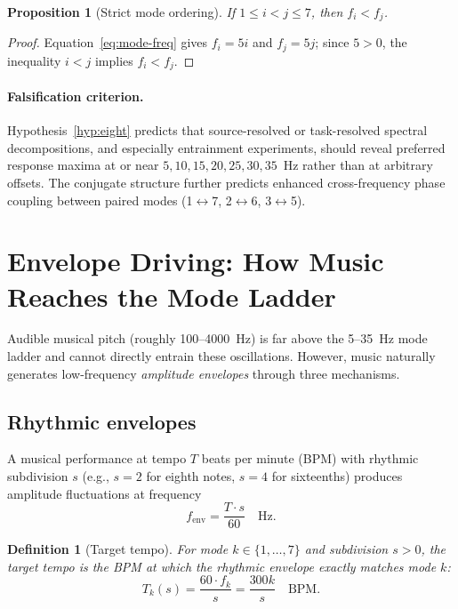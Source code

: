 \documentclass[11pt,a4paper]{article}
\newtheorem{proposition}[theorem]{Proposition}
\newtheorem{definition}[theorem]{Definition}
\begin{document}
\begin{proposition}[Strict mode ordering]
\label{prop:mode-order}
If $1 \le i < j \le 7$, then $f_i < f_j$.
\end{proposition}

\begin{proof}
Equation~\eqref{eq:mode-freq} gives $f_i = 5i$ and $f_j = 5j$; since
$5>0$, the inequality $i<j$ implies $f_i < f_j$.
\end{proof}

\paragraph{Falsification criterion.} Hypothesis~\ref{hyp:eight}
predicts that source-resolved or task-resolved spectral decompositions,
and especially entrainment experiments, should reveal preferred response
maxima at or near $5,10,15,20,25,30,35$~Hz rather than at arbitrary
offsets. The conjugate structure further predicts enhanced
cross-frequency phase coupling between paired modes
(1$\leftrightarrow$7, 2$\leftrightarrow$6, 3$\leftrightarrow$5).

\section{Envelope Driving: How Music Reaches the Mode Ladder}
\label{sec:envelope}

Audible musical pitch (roughly 100--4000~Hz) is far above the 5--35~Hz
mode ladder and cannot directly entrain these oscillations. However,
music naturally generates low-frequency \emph{amplitude envelopes}
through three mechanisms.

\subsection{Rhythmic envelopes}

A musical performance at tempo $T$ beats per minute (BPM) with rhythmic
subdivision $s$ (e.g., $s=2$ for eighth notes, $s=4$ for sixteenths)
produces amplitude fluctuations at frequency
\begin{equation}
  \label{eq:rhythm}
  f_{\mathrm{env}} = \frac{T \cdot s}{60} \quad \text{Hz}.
\end{equation}

\begin{definition}[Target tempo]
\label{def:target-tempo}
For mode $k\in\{1,\ldots,7\}$ and subdivision $s>0$, the
\emph{target tempo} is the BPM at which the rhythmic envelope exactly
matches mode $k$:
\begin{equation}
  \label{eq:target-bpm}
  T_k(s) = \frac{60 \cdot f_k}{s} = \frac{300k}{s} \quad \text{BPM}.
\end{equation}
\end{definition}
\end{document}
